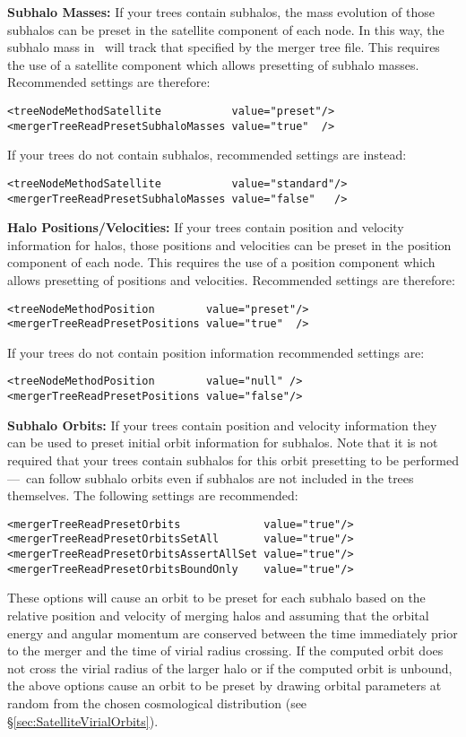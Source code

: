 {\bf Subhalo Masses:} If your trees contain subhalos, the mass evolution of those subhalos can be preset in the satellite component of each \gls{node}. In this way, the subhalo mass in \glc\ will track that specified by the merger tree file. This requires the use of a satellite component which allows presetting of subhalo masses. Recommended settings are therefore:
\begin{verbatim}
<treeNodeMethodSatellite           value="preset"/>
<mergerTreeReadPresetSubhaloMasses value="true"  />
\end{verbatim}
If your trees do not contain subhalos, recommended settings are instead:
\begin{verbatim}
<treeNodeMethodSatellite           value="standard"/>
<mergerTreeReadPresetSubhaloMasses value="false"   />
\end{verbatim}

{\bf Halo Positions/Velocities:} If your trees contain position and velocity information for halos, those positions and velocities can be preset in the position component of each \gls{node}. This requires the use of a position component which allows presetting of positions and velocities. Recommended settings are therefore:
\begin{verbatim}
<treeNodeMethodPosition        value="preset"/>
<mergerTreeReadPresetPositions value="true"  />
\end{verbatim}
If your trees do not contain position information recommended settings are:
\begin{verbatim}
<treeNodeMethodPosition        value="null" />
<mergerTreeReadPresetPositions value="false"/>
\end{verbatim}

{\bf Subhalo Orbits:} If your trees contain position and velocity information they can be used to preset initial orbit information for subhalos. Note that it is not required that your trees contain subhalos for this orbit presetting to be performed---\glc\ can follow subhalo orbits even if subhalos are not included in the trees themselves. The following settings are recommended:
\begin{verbatim}
<mergerTreeReadPresetOrbits             value="true"/>
<mergerTreeReadPresetOrbitsSetAll       value="true"/>
<mergerTreeReadPresetOrbitsAssertAllSet value="true"/>
<mergerTreeReadPresetOrbitsBoundOnly    value="true"/>
\end{verbatim}
These options will cause an orbit to be preset for each subhalo based on the relative position and velocity of merging halos and assuming that the orbital energy and angular momentum are conserved between the time immediately prior to the merger and the time of virial radius crossing. If the computed orbit does not cross the virial radius of the larger halo or if the computed orbit is unbound, the above options cause an orbit to be preset by drawing orbital parameters at random from the chosen cosmological distribution (see \S\ref{sec:SatelliteVirialOrbits}).

